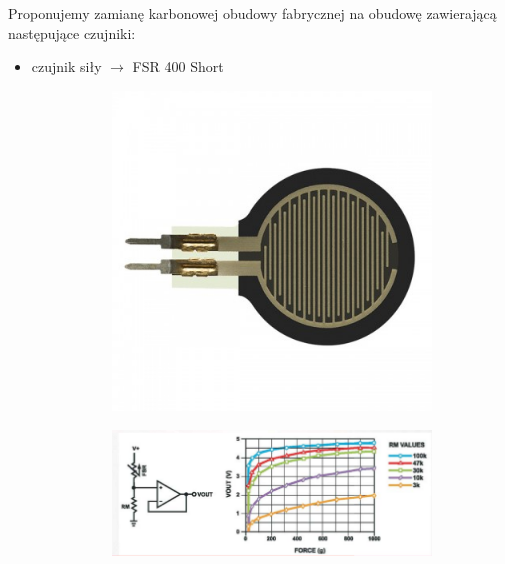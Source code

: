 \documentclass[8pt]{beamer}
\begin{document}
\begin{frame}[allowframebreaks]%
	Proponujemy zamianę karbonowej obudowy fabrycznej na obudowę zawierającą następujące czujniki:
	\begin{itemize}
		\item czujnik siły $\rightarrow$ FSR 400 Short
			\begin{figure}
				\begin{center}
        			\begin{subfigure}[b]{0.15\textwidth}
                		\includegraphics[width=\textwidth]{graphics/fsr400.jpg}
                		\label{graph:g5}
        			\end{subfigure}\hspace{2cm}
        			\begin{subfigure}[b]{0.3\textwidth}
                		\includegraphics[width=\textwidth]{graphics/fsr400_app.png}
                		\label{graph:g6}
        			\end{subfigure}%
				\end{center}
			\end{figure}
	

\end{itemize}
\end{frame}
\end{document}
